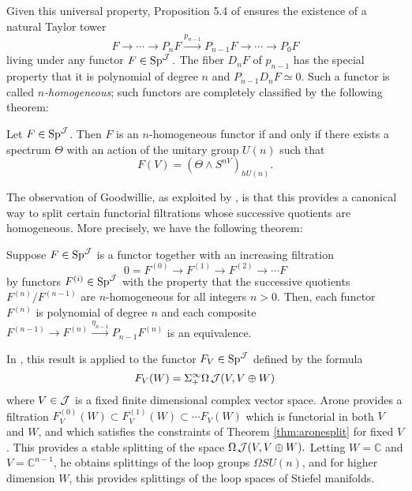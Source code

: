 Given this universal property, Proposition 5.4 of \cite{Weiss} ensures the existence of a natural Taylor tower $$F \longrightarrow \cdots \longrightarrow P_{n} F \xrightarrow{p_{n-1}} P_{n-1} F \longrightarrow \cdots \longrightarrow P_0F$$ living under any functor $F\in \operatorname{\text{Sp}}^{\operatorname{\mathcal{J}}}.$  The fiber $D_n F$ of $p_{n-1}$ has the special property that it is polynomial of degree $n$ and $P_{n-1} D_n F \simeq 0$.  Such a functor is called \emph{$n$-homogeneous}; such functors are completely classified by the following theorem:

\begin{thm}
Let $F\in \operatorname{\text{Sp}}^{\operatorname{\mathcal{J}}}$.  Then $F$ is an $n$-homogeneous functor if and only if there exists a spectrum $\Theta$ with an action of the unitary group $U(n)$ such that $$F(V) = (\Theta \wedge S^{nV})_{hU(n)}.$$
\end{thm}


The observation of Goodwillie, as exploited by \cite{Arone}, is that this provides a canonical way to split certain functorial filtrations whose successive quotients are homogeneous.  More precisely, we have the following theorem:

\begin{thm}\label{thm:aronesplit}
Suppose $F \in \operatorname{\text{Sp}}^{\operatorname{\mathcal{J}}}$ is a functor together with an increasing filtration $$0 = F^{(0)} \longrightarrow F^{(1)}\longrightarrow F^{(2)} \longrightarrow  \cdots F$$ by functors $F^{(i)}\in \operatorname{\text{Sp}}^{\operatorname{\mathcal{J}}}$ with the property that the successive quotients $F^{(n)}/F^{(n-1)}$ are $n$-homogeneous for all integers $n>0$.  Then, each functor $F^{(n)}$ is polynomial of degree $n$ and each composite $F^{(n-1)} \longrightarrow F^{(n)} \xrightarrow{\eta_{n-1}} P_{n-1} F^{(n)}$ is an equivalence.
\end{thm}

In \cite{Arone}, this result is applied to the functor $F_V \in \operatorname{\text{Sp}}^{\operatorname{\mathcal{J}}}$ defined by the formula $$F_V(W) = \Sigma^{\infty}_+ \Omega \operatorname{\mathcal{J}}(V,V\oplus W)$$ where $V\in \operatorname{\mathcal{J}}$ is a fixed finite dimensional complex vector space.  Arone provides a filtration $F^{(0)}_V(W) \subset F^{(1)}_V(W) \subset \cdots F_V(W)$ which is functorial in both $V$ and $W$, and which satisfies the constraints of Theorem \ref{thm:aronesplit} for fixed $V$.  This provides a stable splitting of the space $\Omega \operatorname{\mathcal{J}}(V,V\oplus W).$  Letting $W=\mathbb{C}$ and $V=\mathbb{C}^{n-1}$, he obtains splittings of the loop groups $\Omega SU(n)$, and for higher dimension $W$, this provides splittings of the loop spaces of Stiefel manifolds.  

